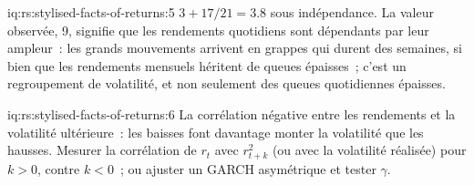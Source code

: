 \begin{solution}{iq:rs:stylised-facts-of-returns:5}
$3 + 17/21 = 3.8$ sous indépendance. La valeur observée, 9, signifie que les rendements quotidiens sont dépendants par leur ampleur~: les grands mouvements arrivent
en grappes qui durent des semaines, si bien que les rendements mensuels héritent de queues épaisses~; c'est un regroupement de volatilité, et non seulement des queues quotidiennes épaisses.
\end{solution}

\begin{solution}{iq:rs:stylised-facts-of-returns:6}
La corrélation négative entre les rendements et la volatilité ultérieure~: les baisses font davantage monter la volatilité que les hausses. Mesurer la corrélation de
$r_t$ avec $r_{t+k}^2$ (ou avec la volatilité réalisée) pour $k > 0$, contre $k < 0$~; ou ajuster un GARCH asymétrique et tester $\gamma$.
\end{solution}
